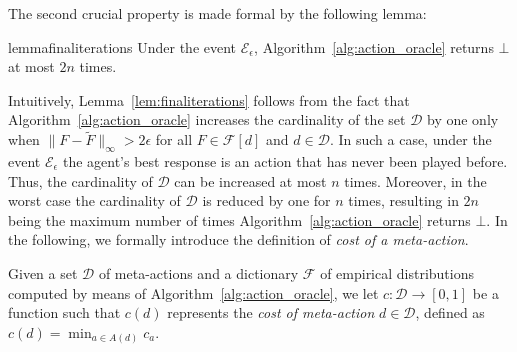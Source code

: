 %
The second crucial property is made formal by the following lemma:
%
\begin{restatable}{lemma}{finaliterations}\label{lem:finaliterations}
	Under the event $\mathcal{E}_\epsilon$, Algorithm~\ref{alg:action_oracle} returns $\bot$ at most $2n$ times.
\end{restatable}
%
Intuitively, Lemma~\ref{lem:finaliterations} follows from the fact that Algorithm~\ref{alg:action_oracle} increases the cardinality of the set $\mathcal{D}$ by one only when $\|  F - \widetilde{F} \|_\infty > 2 \epsilon$ for all ${F} \in \mathcal{F}[d]$ and $d \in \mathcal{D}$.
%
In such a case, under the event $\mathcal{E}_\epsilon$ the agent's best response is an action that has never been played before.
%
Thus, the cardinality of $\mathcal{D}$ can be increased at most $n$ times.
%
Moreover, in the worst case the cardinality of $\mathcal{D}$ is reduced by one for $n$ times, resulting in $2 n $ being the maximum number of times Algorithm~\ref{alg:action_oracle} returns $\bot$.
In the following, we formally introduce the definition of \emph{cost of a meta-action}.
%
%
\begin{definition}\label{def:cost_action}
	Given a set $\mathcal{D}$ of meta-actions and a dictionary $\mathcal{F}$ of empirical distributions computed by means of Algorithm~\ref{alg:action_oracle}, we let $c: \mathcal{D} \to [0,1]$ be a function such that $c(d)$ represents the \emph{cost of meta-action} $d \in \mathcal{D}$, defined as $c(d) = \min_{a \in A(d)} c_{a}$.
\end{definition}
